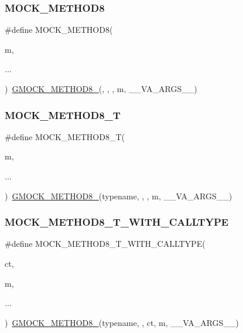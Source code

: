 \subsubsection{\texorpdfstring{MOCK\_METHOD8}{MOCK\_METHOD8}}
{\footnotesize\ttfamily \#define M\+O\+C\+K\+\_\+\+M\+E\+T\+H\+O\+D8(\begin{DoxyParamCaption}\item[{}]{m,  }\item[{}]{... }\end{DoxyParamCaption})~\mbox{\hyperlink{gmock-generated-function-mockers_8h_aa84a36427c44505207b7cad5dec7ad67}{G\+M\+O\+C\+K\+\_\+\+M\+E\+T\+H\+O\+D8\+\_\+}}(, , , m, \+\_\+\+\_\+\+V\+A\+\_\+\+A\+R\+G\+S\+\_\+\+\_\+)}

\mbox{\label{gmock-generated-function-mockers_8h_aa7e6573bb6a57f2a2d3c2875caeffaa3}} 
\subsubsection{\texorpdfstring{MOCK\_METHOD8\_T}{MOCK\_METHOD8\_T}}
{\footnotesize\ttfamily \#define M\+O\+C\+K\+\_\+\+M\+E\+T\+H\+O\+D8\+\_\+T(\begin{DoxyParamCaption}\item[{}]{m,  }\item[{}]{... }\end{DoxyParamCaption})~\mbox{\hyperlink{gmock-generated-function-mockers_8h_aa84a36427c44505207b7cad5dec7ad67}{G\+M\+O\+C\+K\+\_\+\+M\+E\+T\+H\+O\+D8\+\_\+}}(typename, , , m, \+\_\+\+\_\+\+V\+A\+\_\+\+A\+R\+G\+S\+\_\+\+\_\+)}

\mbox{\label{gmock-generated-function-mockers_8h_a0cf1d3aba371dfe424d27b97b5473174}} 
\subsubsection{\texorpdfstring{MOCK\_METHOD8\_T\_WITH\_CALLTYPE}{MOCK\_METHOD8\_T\_WITH\_CALLTYPE}}
{\footnotesize\ttfamily \#define M\+O\+C\+K\+\_\+\+M\+E\+T\+H\+O\+D8\+\_\+\+T\+\_\+\+W\+I\+T\+H\+\_\+\+C\+A\+L\+L\+T\+Y\+PE(\begin{DoxyParamCaption}\item[{}]{ct,  }\item[{}]{m,  }\item[{}]{... }\end{DoxyParamCaption})~\mbox{\hyperlink{gmock-generated-function-mockers_8h_aa84a36427c44505207b7cad5dec7ad67}{G\+M\+O\+C\+K\+\_\+\+M\+E\+T\+H\+O\+D8\+\_\+}}(typename, , ct, m, \+\_\+\+\_\+\+V\+A\+\_\+\+A\+R\+G\+S\+\_\+\+\_\+)}

